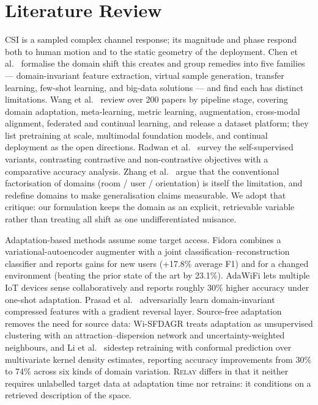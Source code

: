 \documentclass[conference]{IEEEtran}
\newcommand{\method}{\textsc{Relay}}
\begin{document}

\section{Literature Review}
\label{sec:related}

CSI is a sampled complex channel response; its magnitude and phase respond both to human
motion and to the static geometry of the deployment. Chen et al.\ \cite{Chen2022Survey}
formalise the domain shift this creates and group remedies into five families ---
domain-invariant feature extraction, virtual sample generation, transfer learning,
few-shot learning, and big-data solutions --- and find each has distinct limitations.
Wang et al.\ \cite{Wang2025GeneralizabilitySurvey} review over 200 papers by pipeline
stage, covering domain adaptation, meta-learning, metric learning, augmentation,
cross-modal alignment, federated and continual learning, and release a dataset platform;
they list pretraining at scale, multimodal foundation models, and continual deployment as
the open directions. Radwan et al.\ \cite{Radwan2025Survey} survey the self-supervised
variants, contrasting contrastive and non-contrastive objectives with a comparative
accuracy analysis. Zhang et al.\ \cite{Zhang2026BeyondLabels} argue that the conventional
factorisation of domains (room / user / orientation) is itself the limitation, and
redefine domains to make generalisation claims measurable. We adopt that critique: our
formulation keeps the domain as an explicit, retrievable variable rather than treating all
shift as one undifferentiated nuisance.

Adaptation-based methods assume some target access. Fidora \cite{Chen2022Fidora} combines a
variational-autoencoder augmenter with a joint classification--reconstruction classifier
and reports gains for new users (+17.8\% average F1) and for a changed environment
(beating the prior state of the art by 23.1\%). AdaWiFi \cite{Zheng2025AdaWiFi} lets
multiple IoT devices sense collaboratively and reports roughly 30\% higher accuracy under
one-shot adaptation. Prasad et al.\ \cite{Prasad2024DANN} adversarially learn
domain-invariant compressed features with a gradient reversal layer. Source-free
adaptation removes the need for source data: Wi-SFDAGR \cite{Yan2025WiSFDAGR} treats
adaptation as unsupervised clustering with an attraction--dispersion network and
uncertainty-weighted neighbours, and Li et al.\ \cite{Li2026Conformal} sidestep retraining
with conformal prediction over multivariate kernel density estimates, reporting accuracy
improvements from 30\% to 74\% across six kinds of domain variation.
\method{} differs in that it neither requires unlabelled target data at
adaptation time nor retrains: it conditions on a retrieved description of the space.
\end{document}
